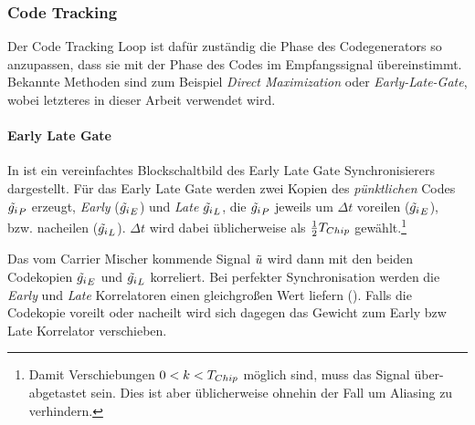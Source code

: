 \subsubsection{Code Tracking}
Der Code Tracking Loop ist dafür zuständig die Phase des Codegenerators so anzupassen, dass sie mit der Phase des Codes im Empfangssignal übereinstimmt. Bekannte Methoden sind zum Beispiel \emph{Direct Maximization} oder \emph{Early-Late-Gate}, wobei letzteres in dieser Arbeit verwendet wird. 


\paragraph{Early Late Gate} \label{EarlyLateGate} In  ist ein vereinfachtes Blockschaltbild des Early Late Gate Synchronisierers dargestellt. Für das Early Late Gate werden zwei Kopien des \emph{pünktlichen} Codes $\tilde{g_i}_P$ erzeugt, \emph{Early} ($\tilde{g_i}_E$) und \emph{Late} $\tilde{g_i}_L$, die $\tilde{g_i}_P$ jeweils  um $\Delta t$ voreilen ($\tilde{g_i}_E$), bzw. nacheilen ($\tilde{g_i}_L$). $\Delta t$ wird dabei üblicherweise als $\frac{1}{2} {T}_{Chip}$ gewählt.\footnote{Damit Verschiebungen $0<k<{T}_{Chip}$ möglich sind, muss das Signal über-abgetastet sein. Dies ist aber üblicherweise ohnehin der Fall um Aliasing zu verhindern.}

Das vom Carrier Mischer kommende Signal $\tilde{u}$ wird dann mit den beiden Codekopien $\tilde{g_i}_E$ und $\tilde{g_i}_L$ korreliert. Bei perfekter Synchronisation werden die \emph{Early} und \emph{Late} Korrelatoren einen gleichgroßen Wert liefern (). Falls die Codekopie voreilt oder nacheilt wird sich dagegen das Gewicht zum Early bzw Late Korrelator verschieben. 


\newcommand{\markerEarly}{\tikz{ \filldraw[fill=bmh02, draw=black, thin] (0,0) circle (.8ex); }~}
\newcommand{\markerLate}{\tikz{ \filldraw[fill=bmh04, draw=black, thin] (0,0) rectangle (1.4ex,1.4ex); }~}

